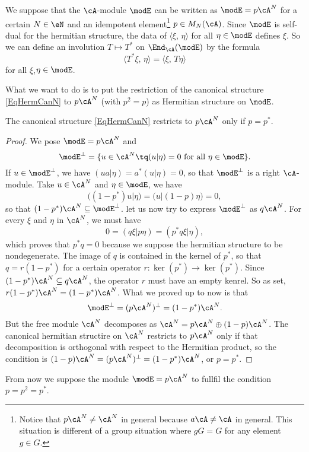 We suppose that the $\cA$-module $\modE$ can be written as $\modE=p\cA^N$ for a certain $N\in \eN$ and an idempotent element\footnote{Notice that $p\cA^N\neq\cA^N$ in general because $a\cA\neq\cA$ in general. This situation is different of a group situation where $gG=G$ for any element $g\in G$.} $p\in M_N(\cA)$. Since $\modE$ is self-dual for the hermitian structure, the data of $\langle \xi,\,\eta\rangle$ for all $\eta\in\modE$ defines $\xi$. So we can define an involution $T\mapsto T^*$ on $\End_{\cA}(\modE)$ by the formula
\[ 
  \langle T^*\xi,\,\eta\rangle=\langle \xi,\,T\eta\rangle
\]
for all $\xi$,$\eta\in\modE$.

What we want to do is to put the restriction of the canonical structure \eqref{EqHermCanN} to $p\cA^N$ (with $p^2=p$) as Hermitian structure on $\modE$. 

\begin{proposition}
The canonical structure \eqref{EqHermCanN} restricts to $p\cA^N$ only if $p=p^*$.
\end{proposition}

\begin{proof}
We pose $\modE=p\cA^N$ and 
\[ 
  \modE^{\perp}=\{ u\in\cA^N\tq (u|\eta)=0\text{ for all }\eta\in\modE \}.
\]
If $u\in\modE^{\perp}$, we have $(ua|\eta)=a^*(u|\eta)=0$, so that $\modE^{\perp}$ is a right $\cA$-module. Take $u\in\cA^N$ and $\eta\in\modE$, we have
\[ 
  \big( (1-p^*)u | \eta\big) =\big( u | (1-p)\eta\big) =0,
\]
so that $(1-p^*)\cA^N\subseteq\modE^{\perp}$. let us now try to express $\modE^{\perp}$ as $q\cA^N$. For every $\xi$ and $\eta$ in $\cA^N$, we must have
\[ 
  0=( q\xi | p\eta) =( p^*q\xi | \eta),
\]
which proves that $p^*q=0$ because we suppose the hermitian structure to be nondegenerate. The image of $q$ is contained in the kernel of $p^*$, so that $q=r(1-p^*)$ for a certain operator $r\colon \ker(p^*)\to \ker(p^*)$. Since $(1-p^*)\cA^N\subseteq q\cA^N$, the operator $r$ must have an empty kenrel. So as set, $r(1-p^*)\cA^N=(1-p^*)\cA^N$. What we proved up to now is that
\[ 
  \modE^{\perp}=(p\cA^N)^{\perp}=(1-p^*)\cA^N.
\]
But the free module $\cA^N$ decomposes as $\cA^N=p\cA^N\oplus (1-p)\cA^N$. The canonical hermitian structire on $\cA^N$ restricts to $p\cA^N$ only if that decomposition is orthogonal with respect to the Hermitian product, so the condition is $(1-p)\cA^N=(p\cA^N)^{\perp}=(1-p^*)\cA^N$, or $p=p^*$.
\end{proof}

From now we suppose the module $\modE=p\cA^N$ to fullfil the condition $p=p^2=p^*$.


